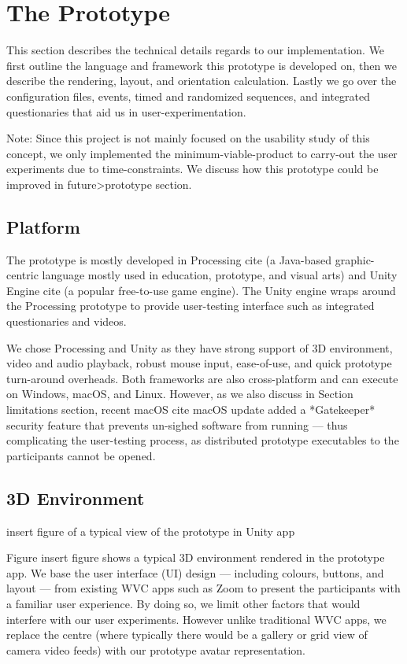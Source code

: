 \section{The Prototype}

This section describes the technical details regards to our implementation. We first outline the language and framework this prototype is developed on, then we describe the rendering, layout, and orientation calculation. Lastly we go over the configuration files, events, timed and randomized sequences, and integrated questionaries that aid us in user-experimentation.

Note: Since this project is not mainly focused on the usability study of this concept, we only implemented the minimum-viable-product to carry-out the user experiments due to time-constraints. We discuss how this prototype could be improved in future>prototype section.

\subsection{Platform}

The prototype is mostly developed in Processing cite (a Java-based graphic-centric language mostly used in education, prototype, and visual arts) and Unity Engine cite (a popular free-to-use game engine). The Unity engine wraps around the Processing prototype to provide user-testing interface such as integrated questionaries and videos.

We chose Processing and Unity as they have strong support of 3D environment, video and audio playback, robust mouse input, ease-of-use, and quick prototype turn-around overheads. Both frameworks are also cross-platform and can execute on Windows, macOS, and Linux. However, as we also discuss in Section limitations section, recent macOS cite macOS update added a *Gatekeeper* security feature that prevents un-sighed software from running --- thus complicating the user-testing process, as distributed prototype executables to the participants cannot be opened.

\subsection{3D Environment}

insert figure of a typical view of the prototype in Unity app

Figure insert figure shows a typical 3D environment rendered in the prototype app. We base the user interface (UI) design --- including colours, buttons, and layout --- from existing WVC apps such as Zoom to present the participants with a familiar user experience. By doing so, we limit other factors that would interfere with our user experiments. However unlike traditional WVC apps, we replace the centre (where typically there would be a gallery or grid view of camera video feeds) with our prototype avatar representation.

